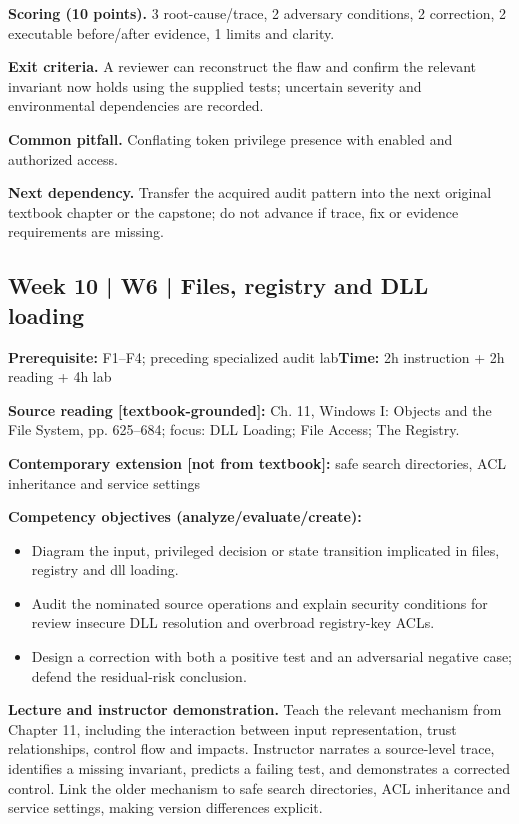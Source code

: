 \documentclass[10pt,letterpaper]{article}
\begin{document}
\textbf{Scoring (10 points).} 3 root-cause/trace, 2 adversary conditions, 2 correction, 2 executable before/after evidence, 1 limits and clarity.

\textbf{Exit criteria.} A reviewer can reconstruct the flaw and confirm the relevant invariant now holds using the supplied tests; uncertain severity and environmental dependencies are recorded.

\textbf{Common pitfall.} Conflating token privilege presence with enabled and authorized access.

\textbf{Next dependency.} Transfer the acquired audit pattern into the next original textbook chapter or the capstone; do not advance if trace, fix or evidence requirements are missing.

\subsection{Week 10 | W6 | Files, registry and DLL loading}
\textbf{Prerequisite:} F1--F4; preceding specialized audit lab\hfill\textbf{Time:} 2h instruction + 2h reading + 4h lab

\textbf{Source reading [textbook-grounded]:} Ch. 11, Windows I: Objects and the File System, pp. 625--684; focus: DLL Loading; File Access; The Registry.

\textbf{Contemporary extension [not from textbook]:} safe search directories, ACL inheritance and service settings

\textbf{Competency objectives (analyze/evaluate/create):}
\begin{itemize}[leftmargin=*,itemsep=2pt]
\item Diagram the input, privileged decision or state transition implicated in files, registry and dll loading.
\item Audit the nominated source operations and explain security conditions for review insecure DLL resolution and overbroad registry-key ACLs.
\item Design a correction with both a positive test and an adversarial negative case; defend the residual-risk conclusion.
\end{itemize}
\textbf{Lecture and instructor demonstration.} Teach the relevant mechanism from Chapter 11, including the interaction between input representation, trust relationships, control flow and impacts. Instructor narrates a source-level trace, identifies a missing invariant, predicts a failing test, and demonstrates a corrected control. Link the older mechanism to safe search directories, ACL inheritance and service settings, making version differences explicit.
\end{document}
